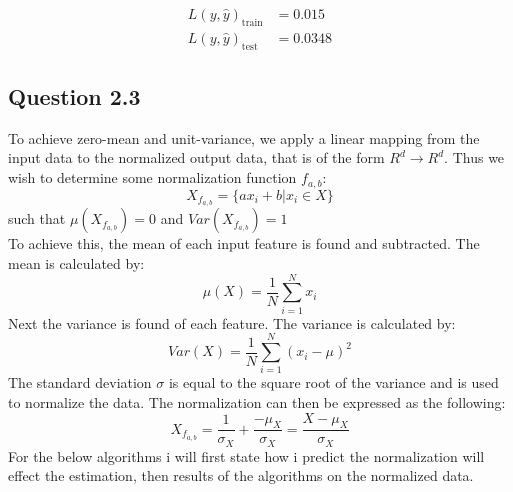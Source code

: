 \documentclass{article}
\begin{document}
\begin{align*}
L(y,\hat{y})_{\text{train}} &= 0.015 \\
L(y,\hat{y})_{\text{test}} &= 0.0348
\end{align*}
\subsection{Question 2.3}
To achieve zero-mean and unit-variance, we apply a linear mapping from the input data to the normalized output data, that is of the form $R^d \rightarrow R^d$. Thus we wish to determine some normalization function $ f_{a,b}$:
\begin{equation}
X_{f_{a,b}}  = \lbrace a x_i+b | x_i \in X \rbrace
\end{equation}
such that $\mu(X_{f_{a,b}})=0$ and $Var(X_{f_{a,b}})=1$ \\
To achieve this, the mean of each input feature is found and subtracted. The mean is calculated by:
\begin{equation*}
\mu(X) = \dfrac{1}{N} \sum\limits^{N}_{i=1}x_i
\end{equation*}
 Next the variance is found of each feature. The variance is calculated by:
\begin{equation*}
Var(X) = \dfrac{1}{N} \sum\limits^{N}_{i=1}(x_i - \mu)^2
\end{equation*}
The standard deviation $\sigma$ is equal to the square root of the variance and is used to normalize the data. The normalization can then be expressed as the following:
\begin{equation}
X_{f_{a,b}} = \dfrac{1}{\sigma_X} + \dfrac{- \mu_X}{\sigma_X} = \dfrac{X - \mu_X }{\sigma_X}
\label{norm}
\end{equation}
For the below algorithms i will first state how i predict the normalization will effect the estimation, then results of the algorithms on the normalized data.
\end{document}
